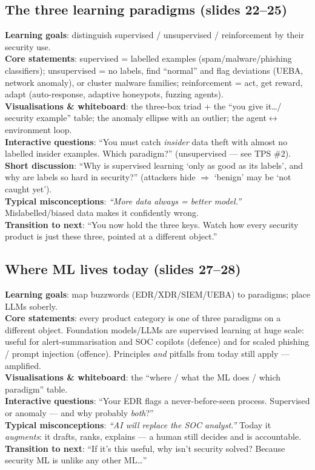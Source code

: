 \documentclass[11pt,a4paper]{article}
\newcommand{\obj}{\textbf{\color{accent}Learning goals}}
\newcommand{\core}{\textbf{\color{accent}Core statements}}
\newcommand{\viz}{\textbf{\color{accent}Visualisations \& whiteboard}}
\newcommand{\ask}{\textbf{\color{accent}Interactive questions}}
\newcommand{\disc}{\textbf{\color{accent}Short discussion}}
\newcommand{\misc}{\textbf{\color{bad}Typical misconceptions}}
\newcommand{\trans}{\textbf{\color{mlsig}Transition to next}}
\begin{document}
\subsection{The three learning paradigms (slides 22--25)}
\obj: distinguish supervised / unsupervised / reinforcement by their security use.\\
\core: supervised = labelled examples (spam/malware/phishing classifiers);
unsupervised = no labels, find ``normal'' and flag deviations (UEBA, network
anomaly), or cluster malware families; reinforcement = act, get reward, adapt
(auto-response, adaptive honeypots, fuzzing agents).\\
\viz: the three-box triad + the ``you give it\ldots / security example'' table;
the anomaly ellipse with an outlier; the agent$\leftrightarrow$environment loop.\\
\ask: ``You must catch \emph{insider} data theft with almost no labelled insider
examples. Which paradigm?'' (unsupervised --- see TPS \#2).\\
\disc: ``Why is supervised learning `only as good as its labels', and why are
labels so hard in security?'' (attackers hide $\Rightarrow$ `benign' may be `not
caught yet').\\
\misc: \emph{``More data always = better model.''} Mislabelled/biased data makes
it confidently wrong.\\
\trans: ``You now hold the three keys. Watch how every security product is just
these three, pointed at a different object.''

\subsection{Where ML lives today (slides 27--28)}
\obj: map buzzwords (EDR/XDR/SIEM/UEBA) to paradigms; place LLMs soberly.\\
\core: every product category is one of three paradigms on a different object.
Foundation models/LLMs are supervised learning at huge scale: useful for
alert-summarisation and SOC copilots (defence) and for scaled phishing / prompt
injection (offence). Principles \emph{and} pitfalls from today still apply --- amplified.\\
\viz: the ``where / what the ML does / which paradigm'' table.\\
\ask: ``Your EDR flags a never-before-seen process. Supervised or anomaly ---
and why probably \emph{both}?''\\
\misc: \emph{``AI will replace the SOC analyst.''} Today it \emph{augments}: it
drafts, ranks, explains --- a human still decides and is accountable.\\
\trans: ``If it's this useful, why isn't security solved? Because security ML is
unlike any other ML\ldots''
\end{document}
